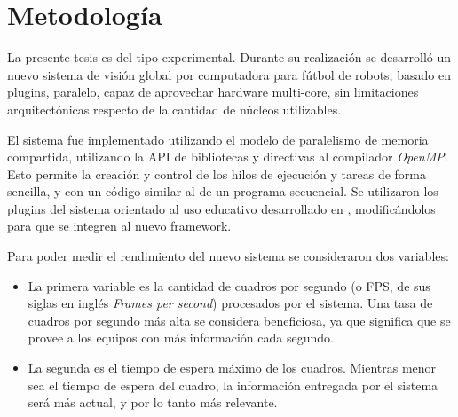 
\section{Metodología}

\label{metodologia}

La presente tesis es del tipo experimental. Durante su realización se desarrolló
un nuevo sistema de visión global por computadora para fútbol de robots, basado
en plugins, paralelo, capaz de aprovechar hardware multi-core, sin limitaciones
arquitectónicas respecto de la cantidad de núcleos utilizables.

El sistema fue implementado utilizando el modelo de paralelismo de memoria
compartida, utilizando la API de bibliotecas y directivas al compilador
\emph{OpenMP}. Esto permite la creación y control de los hilos de ejecución y
tareas de forma sencilla, y con un código similar al de un programa secuencial.
Se utilizaron los plugins del sistema orientado al uso educativo desarrollado en
\cite{torres2014}, modificándolos para que se integren al nuevo framework.

Para poder medir el rendimiento del nuevo sistema se consideraron dos variables:

\begin {itemize}

	\item	La primera variable es la cantidad de cuadros por segundo (o
		FPS, de sus siglas en inglés \emph{Frames per second})
		procesados por el sistema. Una tasa de cuadros por segundo más
		alta se considera beneficiosa, ya que significa que se provee a
		los equipos con más información cada segundo.

	\item	La segunda es el tiempo de espera máximo de los cuadros.
		Mientras menor sea el tiempo de espera del cuadro, la
		información entregada por el sistema será más actual, y por lo
		tanto más relevante.

\end {itemize}
